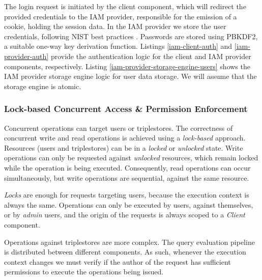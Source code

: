 The login request is initiated by the client component, which will redirect the provided credentials to the IAM provider, responsible for the emission of a cookie, holding the session data. In the IAM provider we store the user credentials, following \gls{NIST} best practices \autocite{Nist-dy}. Passwords are stored using \gls{PBKDF2}, a suitable one-way key derivation function. Listings \ref{iam-client-auth} and \ref{iam-provider-auth} provide the authentication logic for the client and IAM provider components, respectively. Listing \ref{iam-provider-storage-engine-users} shows the IAM provider storage engine logic for user data storage. We will assume that the storage engine is atomic.

%

%

%

\subsubsection{Lock-based Concurrent Access \& Permission Enforcement}

Concurrent operations can target users or triplestores. The correctness of concurrent write and read operations is achieved using a \emph{lock-based} approach. Resources (users and triplestores) can be in a \emph{locked} or \emph{unlocked} state. Write operations can only be requested against \emph{unlocked} resources, which remain locked while the operation is being executed. Consequently, read operations can occur simultaneously, but write operations are sequential, against the same resource.

\emph{Locks} are enough for requests targeting users, because the execution context is always the same. Operations can only be executed by users, against themselves, or by \emph{admin} users, and the origin of the requests is always scoped to a \emph{Client} component.

Operations against triplestores are more complex. The query evaluation pipeline is distributed between different components. As such, whenever the execution context changes we must verify if the author of the request has sufficient permissions to execute the operations being issued.

